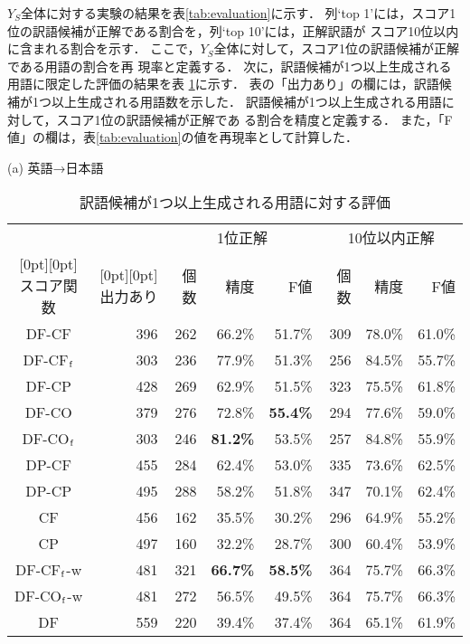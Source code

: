 \documentclass[japanese]{jnlp_1.3a}
\begin{document}
$Y_S$全体に対する実験の結果を表\ref{tab:evaluation}に示す．
列`top 1'には，スコア1位の訳語候補が正解である割合を，列`top 10'には，正解訳語が
スコア10位以内に含まれる割合を示す．
ここで，$Y_S$全体に対して，スコア1位の訳語候補が正解である用語の割合を再
現率と定義する．
次に，訳語候補が1つ以上生成される用語に限定した評価の結果を表
\ref{tab:precision}に示す．
表の「出力あり」の欄には，訳語候補が1つ以上生成される用語数を示した．
訳語候補が1つ以上生成される用語に対して，スコア1位の訳語候補が正解であ
る割合を精度と定義する．
また，「F値」の欄は，表\ref{tab:evaluation}の値を再現率として計算した．

\begin{table}[t]
 \small
 \centering
 \caption{訳語候補が1つ以上生成される用語に対する評価}
 \label{tab:precision}
 (a) 英語→日本語
\vspace{4pt}

 \begin{tabular}{|c|r|r|r|r|r|r|r|}
  \hline
  & & \multicolumn{3}{|c|}{1位正解} & \multicolumn{3}{|c|}{10位以内正解}\\
      \cline{3-8}
    \raisebox{0.5\normalbaselineskip}[0pt][0pt]{スコア関数} & \raisebox{0.5\normalbaselineskip}[0pt][0pt]{出力あり} 
	& 個数 & 精度 & F値 & 個数 & 精度 & F値\\
  \hline \hline
  DF-CF     & 396 & 262 & 66.2\% & 51.7\% & 309 & 78.0\% & 61.0\%\\
  DF-CF${\rm _f}$    & 303 & 236 & 77.9\% & 51.3\% & 256 & 84.5\% & 55.7\%\\
  DF-CP     & 428 & 269 & 62.9\% & 51.5\% & 323 & 75.5\% & 61.8\%\\
  DF-CO     & 379 & 276 & 72.8\% & {\bf 55.4\%} & 294 & 77.6\% & 59.0\%\\
  DF-CO${\rm _f}$ & 303 & 246 & {\bf 81.2\%} & 53.5\% & 257 & 84.8\% & 55.9\%\\
  DP-CF     & 455 & 284 & 62.4\% & 53.0\% & 335 & 73.6\% & 62.5\%\\
  DP-CP     & 495 & 288 & 58.2\% & 51.8\% & 347 & 70.1\% & 62.4\%\\
  CF        & 456 & 162 & 35.5\% & 30.2\% & 296 & 64.9\% & 55.2\%\\
  CP        & 497 & 160 & 32.2\% & 28.7\% & 300 & 60.4\% & 53.9\%\\
  \hline            
  DF-CF${\rm _f}$-w  & 481 & 321 & {\bf 66.7\%} & {\bf 58.5\%} & 364 & 75.7\% & 66.3\%\\
  DF-CO${\rm _f}$-w  & 481 & 272 & 56.5\% & 49.5\% & 364 & 75.7\% & 66.3\%\\
  \hline            
  DF        & 559 & 220 & 39.4\% & 37.4\% & 364 & 65.1\% & 61.9\%\\
  \hline
 \end{tabular}


\end{table}
\end{document}
